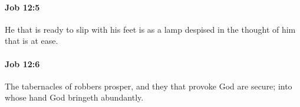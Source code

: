 		\paragraph{Job 12:5} %
			\label{JOB-12-5}

			He that is ready to slip with his feet is as a lamp despised in the thought of him that is at ease.


		\paragraph{Job 12:6} %
			\label{JOB-12-6}

			The tabernacles of robbers prosper, and they that provoke God are secure; into whose hand God bringeth abundantly.


